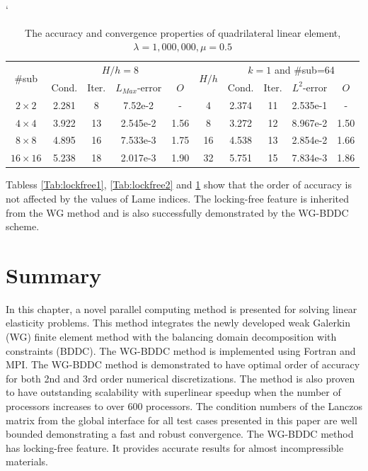 											\vspace{5mm}
											\begin{table}[ht]
												\small
												\vspace{-10pt}
												\setlength{\tabcolsep}{1pt} {
													\vspace{-5pt}
													\begin{center}`
														\begin{tabular}{c|cccc|c|cccc}
															\hline
															\multirow{2}{*}{\#sub} &\multicolumn{4}{c|}{ $H/h=8$} &\multirow{2}{*}{$H/h$} &\multicolumn{4}{c}{$k=1$ and \#sub=64}\\ 
															& Cond.   & Iter. &$L_{Max}$-error & $O$& & Cond.   & Iter. &$L^2$-error & $O$ \\
															
															\hline
															$2\times 2$     & 2.281 & 8   & 7.52e-2 & - & 4   & 2.374 &11 & 2.535e-1 &- \\
															$4\times 4$     &3.922 &13 &2.545e-2 & 1.56 & 8   & 3.272 &12 & 8.967e-2 & 1.50  \\
															$8\times 8$  & 4.895 &16 & 7.533e-3 & 1.75 & 16   & 4.538 &13 & 2.854e-2 & 1.66 \\
															$16\times 16$ &5.238&18 & 2.017e-3 & 1.90 & 32   & 5.751 &15 & 7.834e-3 & 1.86 \\
															\hline	
														\end{tabular}
													\end{center} }
													\caption{The accuracy and convergence properties of quadrilateral linear element, $ \lambda = 1,000,000, \mu = 0.5 $}
													\label{Tab:lockfree3}
												\end{table}
												
												Tabless \ref{Tab:lockfree1}, \ref{Tab:lockfree2} and \ref{Tab:lockfree3} show that the order of accuracy is not affected by the values of Lame indices. The locking-free feature is inherited from the WG method and is also successfully demonstrated by the WG-BDDC scheme.
												
												\section{Summary}
												In this chapter, a novel parallel computing method is presented for solving linear elasticity problems. This method integrates the newly developed weak Galerkin (WG) finite element method with the balancing domain decomposition with constraints (BDDC). The WG-BDDC method is implemented using Fortran and MPI. The WG-BDDC method is demonstrated to have optimal order of accuracy for both 2nd and 3rd order numerical discretizations. The method is also proven to have outstanding scalability with superlinear speedup when the number of processors increases to over 600 processors. The condition numbers of the Lanczos matrix from the global interface for all test cases presented in this paper are well bounded demonstrating a fast and robust convergence. The WG-BDDC method has locking-free feature. It provides accurate results for almost incompressible materials. 